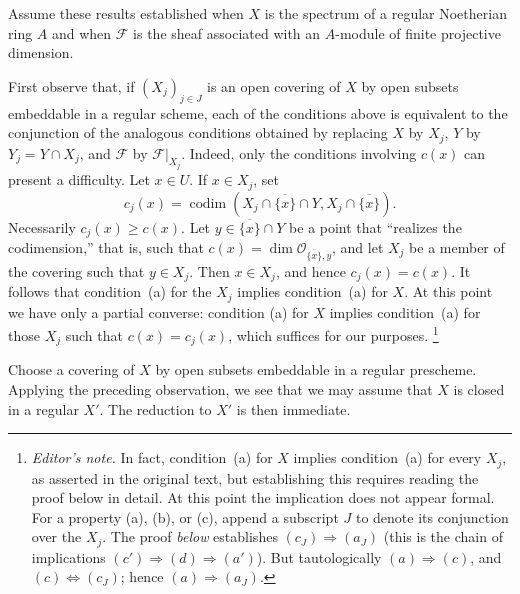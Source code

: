 \documentclass[11pt,a4paper,oneside]{book}
\providecommand{\markedfootnote}[2]{%
  \begingroup\renewcommand{\thefootnote}{#1}\footnote{#2}\endgroup}
\providecommand{\cF}{\mathcal F}
\providecommand{\codim}{\operatorname{codim}}
\theoremstyle{plain}
\theoremstyle{definition}
\theoremstyle{remark}
\begin{document}

\medskip
Assume these results established when $X$ is the spectrum of a regular
Noetherian ring $A$ and when $\cF$ is the sheaf associated with an $A$-module
of finite projective dimension.

First observe that, if $(X_j)_{j\in J}$ is an open covering of $X$ by open
subsets embeddable in a regular scheme, each of the conditions above is
equivalent to the conjunction of the analogous conditions obtained by
replacing $X$ by $X_j$, $Y$ by $Y_j=Y\cap X_j$, and $\cF$ by
$\cF|_{X_j}$. Indeed, only the conditions involving $c(x)$ can present a
difficulty. Let $x\in U$. If $x\in X_j$, set
\[
  c_j(x)=\codim(X_j\cap\overline{\{x\}}\cap Y,
                X_j\cap\overline{\{x\}}).
\]
Necessarily $c_j(x)\geq c(x)$. Let $y\in\overline{\{x\}}\cap Y$ be a point
that ``realizes the codimension,'' that is, such that
$c(x)=\dim\mathcal O_{\overline{\{x\}},y}$, and let $X_j$ be a member of
the covering such that $y\in X_j$. Then $x\in X_j$, and hence
$c_j(x)=c(x)$. It follows that condition~(a) for the $X_j$ implies
condition~(a) for $X$. At this point we have only a partial converse: condition
(a) for $X$ implies condition~(a) for those $X_j$ such that
$c(x)=c_j(x)$, which suffices for our purposes.%
\markedfootnote{(5)}{\textit{Editor's note.} In fact, condition~(a) for $X$
implies condition~(a) for every $X_j$, as asserted in the original text, but
establishing this requires reading the proof below in detail. At this point
the implication does not appear formal. For a property (a), (b), or (c),
append a subscript $J$ to denote its conjunction over the $X_j$. The proof
\textit{below} establishes $(c_J)\Rightarrow(a_J)$ (this is the chain of implications
$(c')\Rightarrow(d)\Rightarrow(a')$). But tautologically
$(a)\Rightarrow(c)$, and $(c)\Longleftrightarrow(c_J)$; hence
$(a)\Rightarrow(a_J)$.}


\setcounter{section}{2}\setcounter{lemma}{3}

\medskip
Choose a covering of $X$ by open subsets embeddable in a regular prescheme.
Applying the preceding observation, we see that we may assume that $X$ is
closed in a regular $X'$. The reduction to $X'$ is then immediate.
\end{document}
